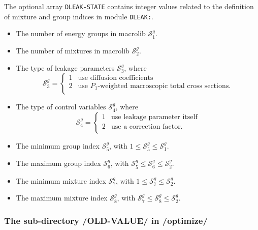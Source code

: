 The optional array {\tt DLEAK-STATE} contains integer values related to the definition of mixture and group indices in module {\tt DLEAK:}.
\begin{itemize}
\item The number of energy groups in macrolib $\mathcal{S}^{g}_{1}$.
\item The number of mixtures in macrolib $\mathcal{S}^{g}_{2}$.
\item The type of leakage parameters $\mathcal{S}^{g}_{3}$,
where
\begin{displaymath}
\mathcal{S}^{g}_{3} = \left\{
\begin{array}{rl}
1 & \textrm{use diffusion coefficients} \\
2 & \textrm{use $P_1$-weighted macroscopic total cross sections.} \\
\end{array} \right.
\end{displaymath}

\item The type of control variables $\mathcal{S}^{g}_{4}$,
where
\begin{displaymath}
\mathcal{S}^{g}_{4} = \left\{
\begin{array}{rl}
1 & \textrm{use leakage parameter itself} \\
2 & \textrm{use a correction factor.} \\
\end{array} \right.
\end{displaymath}

\item The minimum group index $\mathcal{S}^{g}_{5}$, with $1 \le \mathcal{S}^{g}_{5}\le \mathcal{S}^{g}_{1}$.
\item The maximum group index $\mathcal{S}^{g}_{6}$, with $\mathcal{S}^{g}_{5} \le \mathcal{S}^{g}_{6}\le \mathcal{S}^{g}_{2}$.
\item The minimum mixture index $\mathcal{S}^{g}_{7}$, with $1 \le \mathcal{S}^{g}_{7}\le \mathcal{S}^{g}_{2}$.
\item The maximum mixture index $\mathcal{S}^{g}_{8}$, with $\mathcal{S}^{g}_{7} \le \mathcal{S}^{g}_{8}\le \mathcal{S}^{g}_{2}$.

\end{itemize}

\subsubsection{The sub-directory /OLD-VALUE/ in /optimize/}

